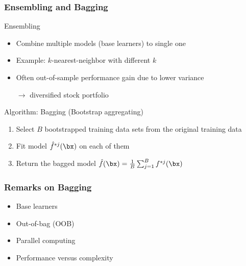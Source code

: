 \begin{frame}
	\frametitle{Ensembling and Bagging}
	\begin{block}{Ensembling}
		\begin{itemize}
			\item Combine multiple models (\alert{base learners}) to single one
			\item Example: $k$-nearest-neighbor with different $k$
			\item Often out-of-sample performance gain due to lower variance 
			
			$\rightarrow$ diversified stock portfolio
		\end{itemize}
	\end{block}
	
	\begin{block}{Algorithm: Bagging (\alert{B}ootstrap \alert{agg}regat\alert{ing})}
		\begin{enumerate}
			\item Select $B$ bootstrapped training data sets from the original training data
			\item Fit model $\hat f^{*j}(\bx)$ on each of them
			\item Return the bagged model 
			$
			\hat f(\bx) = \frac{1}{B} \sum_{j = 1}^B f^{*j}(\bx)
			$
		\end{enumerate}
	\end{block}
	
	\begin{example}
	\end{example}
\end{frame}

\begin{frame}
	\frametitle{Remarks on Bagging}
	
	\begin{itemize}
		\item Base learners
		\item Out-of-bag (OOB)
		\item Parallel computing
		\item Performance versus complexity
	\end{itemize}
\end{frame}

